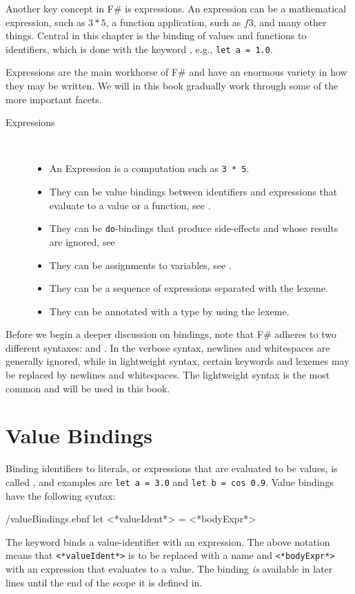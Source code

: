 \documentclass[fsharpNotes.tex]{subfiles}
\begin{document}
Another key concept in F\# is expressions. An expression can be a mathematical expression, such as $3*5$, a function application, such as $f 3$, and many other things. Central in this chapter is the binding of values and functions to identifiers, which is done with the keyword , e.g., \lstinline!let a = 1.0!.

Expressions are the main workhorse of F\# and have an enormous variety in how they may be written. We will in this book gradually work through some of the more important facets.
\begin{description} 
\item[Expressions]~\\[-5mm]
  \begin{itemize}
  \item An Expression is a computation such as \lstinline{3 * 5}.
  \item They can be value bindings between identifiers and expressions that evaluate to a value or a function, see .
  \item They can be \lstinline{do}-bindings that produce side-effects and whose results are ignored, see  
  \item They can be assignments to variables, see .
  \item They can be a sequence of expressions separated with the \idx[;@\lstinline{;}]{\lexeme{;}} lexeme.
  \item They can be annotated with a type by using the \idx[:@\lstinline{:}]{\lexeme{:}} lexeme.
  \end{itemize}
\end{description}

Before we begin a deeper discussion on bindings, note that F\#  adheres to two different syntaxes:  and . In the verbose syntax, newlines and whitespaces are generally ignored, while in lightweight syntax, certain keywords and lexemes may be replaced by newlines and whitespaces. The lightweight syntax is the most common and will be used in this book.

\section{Value Bindings}
\label{sec:values}
Binding identifiers to literals, or expressions that are evaluated to be values, is called , and examples are \lstinline!let a = 3.0! and \lstinline!let b = cos 0.9!. Value bindings have the following syntax:
%
\begin{verbatimwrite}{\ebnf/valueBindings.ebnf}
let <*valueIdent*> = <*bodyExpr*>
\end{verbatimwrite}
%
The  keyword binds a value-identifier with an expression. The above notation means that \lstinline[language=syntax]{<*valueIdent*>} is to be replaced with a name and \lstinline[language=syntax]{<*bodyExpr*>} with an expression that evaluates to a value. The binding \emph{is} available in later lines until the end of the scope it is defined in.
\end{document}
